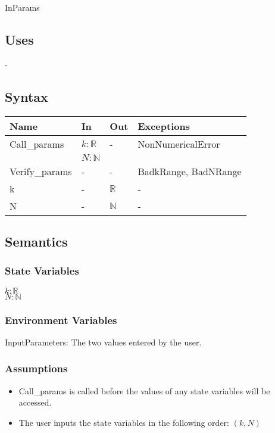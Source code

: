 \documentclass[12pt, titlepage]{article}
\begin{document}
InParams

\subsection{Uses}

-

\subsection{Syntax}

\begin{center}
\begin{tabular}{p{3cm} p{3cm} p{3cm} >{\raggedright\arraybackslash}p{7cm}}
\toprule
\textbf{Name} & \textbf{In} & \textbf{Out} & \textbf{Exceptions} \\
\hline
Call\_params & $k : \mathbb{R}$ & - & NonNumericalError \\
& $N : \mathbb{N}$ &  &  \\
Verify\_params & - & - & BadkRange, BadNRange \\
k & - & $\mathbb{R}$ & - \\
N & - & $\mathbb{N}$ & - \\
\hline
\end{tabular}
\end{center}

\subsection{Semantics}

\subsubsection{State Variables}

$k : \mathbb{R}$ \\ 
$N : \mathbb{N}$ 

\subsubsection{Environment Variables}

InputParameters: The two values entered by the user. 

\subsubsection{Assumptions}

\begin{itemize}
	\item Call\_params is called before the values of any state variables will 
	be accessed.
	\item The user inputs the state variables in the following order: $(k,N)$
\end{itemize}
\end{document}
